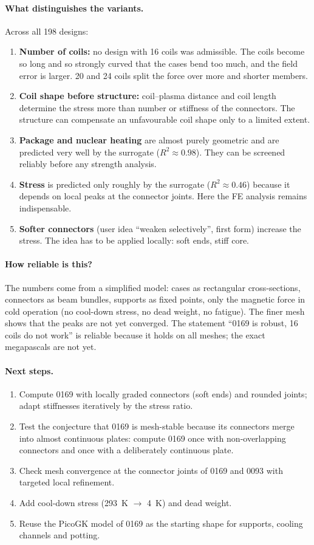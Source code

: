 \paragraph{What distinguishes the variants.} Across all 198 designs:
\begin{enumerate}
\item \textbf{Number of coils:} no design with 16 coils was admissible. The coils become so long and so strongly
  curved that the cases bend too much, and the field error is larger. 20 and 24 coils split the force over more
  and shorter members.
\item \textbf{Coil shape before structure:} coil--plasma distance and coil length determine the stress more than
  number or stiffness of the connectors. The structure can compensate an unfavourable coil shape only to a limited
  extent.
\item \textbf{Package and nuclear heating} are almost purely geometric and are predicted very well by the surrogate
  ($R^2 \approx 0.98$). They can be screened reliably before any strength analysis.
\item \textbf{Stress} is predicted only roughly by the surrogate ($R^2 \approx 0.46$) because it depends on local
  peaks at the connector joints. Here the FE analysis remains indispensable.
\item \textbf{Softer connectors} (user idea ``weaken selectively'', first form) increase the stress. The idea has to
  be applied locally: soft ends, stiff core.
\end{enumerate}

\paragraph{How reliable is this?} The numbers come from a simplified model: cases as rectangular cross-sections,
connectors as beam bundles, supports as fixed points, only the magnetic force in cold operation (no cool-down
stress, no dead weight, no fatigue). The finer mesh shows that the peaks are not yet converged. The statement
``0169 is robust, 16 coils do not work'' is reliable because it holds on all meshes; the exact megapascals are not
yet.

\paragraph{Next steps.}
\begin{enumerate}
\item Compute 0169 with locally graded connectors (soft ends) and rounded joints; adapt stiffnesses iteratively by
  the stress ratio.
\item Test the conjecture that 0169 is mesh-stable because its connectors merge into almost continuous plates:
  compute 0169 once with non-overlapping connectors and once with a deliberately continuous plate.
\item Check mesh convergence at the connector joints of 0169 and 0093 with targeted local refinement.
\item Add cool-down stress (\SI{293}{K} $\to$ \SI{4}{K}) and dead weight.
\item Reuse the PicoGK model of 0169 as the starting shape for supports, cooling channels and potting.
\end{enumerate}
